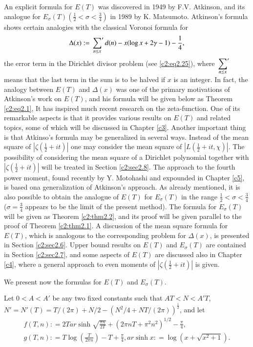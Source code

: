 An explicit formula for $E(T)$ was discovered in 1949 by
F.V. Atkinson, and its analogue for $E_\sigma (T) (\frac{1}{2} <
\sigma < \frac{3}{4})$ in 1989 by K. Matsumoto. Atkinson's formula
shows certain analogies with the classical Voronoi formula for
\begin{equation}
  \Delta  (x) : = \sideset{}{'}\sum_{n \leq x} d(n) - x(\log x + 2
  \gamma -1)- \frac{1}{4},\label{c2:eq2.4}
\end{equation}
the error term in the Dirichlet divisor problem (see
\eqref{c2:eq2.25}), where $\displaystyle{\sideset{}{'}\sum_{n \leq
    x}}$ means that the last term in the sum is to be halved if $x$ is
an integer. In fact, the analogy between $E(T)$ and $\Delta  (x)$
was one of the primary motivations of Atkinson's work on $E(T)$, and
his formula will be given below as Theorem \ref{c2:eq2.1}, It has
inspired much recent research on the zeta-function. One of its
remarkable aspects is that it provides various results on $E(T)$ and
related topics, some of which will be discussed in Chapter \ref{c3}. Another
important thing is that Atkinso's formula may be generalized in
several ways. Instead of the mean square of $|\zeta (\frac{1}{2} +
it)|$ one may consider the mean square of $|L (\frac{1}{2} + it,
\chi)|$. The possibility of considering the mean square of a Dirichlet
polynomial together with $|\zeta (\frac{1}{2} + it)|$ will be treated
in Section \ref{c2:sec2.8}. The approach to the fourth power moment,
found recently by Y. Motohashi and expounded in Chapter \ref{c5}, is based
on\pageoriginale a generalization of Atkinson's approach. As already
mentioned, it is also possible to obtain the analogue of $E(T)$ for
$E_\sigma (T)$ in the range $\frac{1}{2}< \sigma < \frac{3}{4}$ ($\sigma
= \frac{3}{4}$ appears to be the limit of the present method). The
formula for $E_\sigma (T)$ will be given as Theorem \ref{c2:thm2.2},
and its proof will be given parallel to the proof of Theorem
\ref{c2:thm2.1}. A discussion of the mean square formula for $E(T)$,
which is analogous to the corresponding problem for $\Delta (x)$, is
presented in Section \ref{c2:sec2.6}. Upper bound results on $E(T)$
and $E_\sigma (T)$ are contained in Section \ref{c2:sec2.7}, and some
aspects of $E(T)$ are discussed also in Chapter \ref{c4}, where a general
approach to even moments of $|\zeta (\frac{1}{2} + it)|$ is given.

We present now the formulas for $E(T)$ and $E_\sigma (T)$.

\begin{thm}\label{c2:thm2.1}
  Let $0 < A < A'$ be any two fixed constants such that $AT < N < A'
  T$, $N' =N' (T)= T/(2 \pi) + N/2- (N^2/4 + NT/(2
  \pi))^{\frac{1}{2}}$, and let 
  \begin{gather*}
  f(T, n): = 2 T ar \sinh \sqrt{\frac{\pi n}{2 T}} + (2 \pi n T +
  \pi^2 n^2)^{1/2} - \frac{\pi}{4},\\
  g(T, n) : = T \log \left( \frac{T}{2 \pi n}\right) - T +
  \frac{\pi}{4}, ar \sinh x: = \log (x + \sqrt{x^2+1}).
  \end{gather*}
\end{thm}

